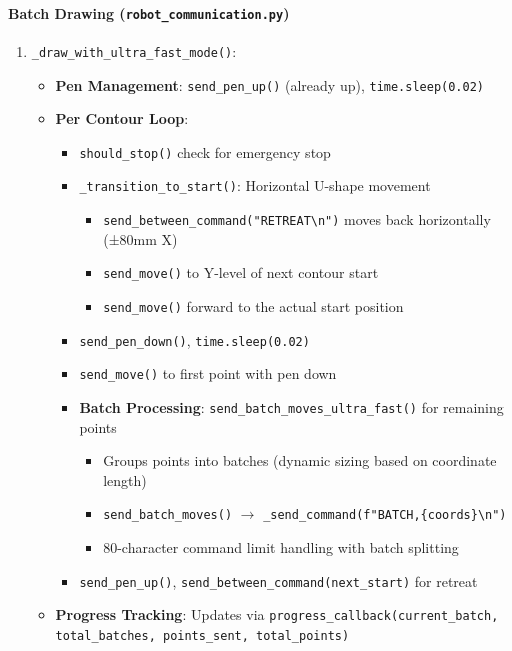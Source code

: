 \documentclass[a4paper,12pt]{article}
\begin{document}
\paragraph{Batch Drawing (\texttt{robot\_communication.py})}
\begin{enumerate}
\item \texttt{\_draw\_with\_ultra\_fast\_mode()}:
	\begin{itemize}
	\item \textbf{Pen Management}: \texttt{send\_pen\_up()} (already up), \texttt{time.sleep(0.02)}
	\item \textbf{Per Contour Loop}:
		\begin{itemize}
		\item \texttt{should\_stop()} check for emergency stop
		\item \texttt{\_transition\_to\_start()}: Horizontal U-shape movement
			\begin{itemize}
			\item \texttt{send\_between\_command("RETREAT\textbackslash n")} moves back horizontally (±80mm X)
			\item \texttt{send\_move()} to Y-level of next contour start
			\item \texttt{send\_move()} forward to the actual start position
			\end{itemize}
		\item \texttt{send\_pen\_down()}, \texttt{time.sleep(0.02)}
		\item \texttt{send\_move()} to first point with pen down
		\item \textbf{Batch Processing}: \texttt{send\_batch\_moves\_ultra\_fast()} for remaining points
			\begin{itemize}
			\item Groups points into batches (dynamic sizing based on coordinate length)
			\item \texttt{send\_batch\_moves()} $\rightarrow$ \texttt{\_send\_command(f"BATCH,\{coords\}\textbackslash n")}
			\item 80-character command limit handling with batch splitting
			\end{itemize}
		\item \texttt{send\_pen\_up()}, \texttt{send\_between\_command(next\_start)} for retreat
		\end{itemize}
	\item \textbf{Progress Tracking}: Updates via \texttt{progress\_callback(current\_batch, total\_batches, points\_sent, total\_points)}
	\end{itemize}
\end{enumerate}
\end{document}
